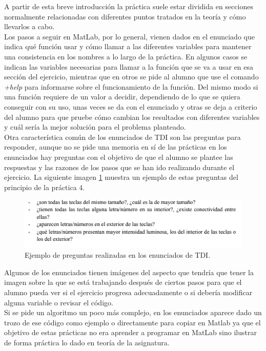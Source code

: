 \documentclass[a4paper,12pt]{report}
\begin{document}
A partir de esta breve introducción la práctica suele estar dividida en secciones normalmente relacionadas con diferentes puntos tratados en la teoría y cómo llevarlos a cabo.\\

Los pasos a seguir en MatLab, por lo general, vienen dados en el enunciado que indica qué función usar y cómo llamar a las diferentes variables para mantener una consistencia en los nombres a lo largo de la práctica. En algunos casos se indican las variables necesarias para llamar a la función que se va a usar en esa sección del ejercicio, mientras que en otros se pide al alumno que use el comando \textsl{+help} para informarse sobre el funcionamiento de la función. Del mismo modo si una función requiere de un valor a decidir, dependiendo de lo que se quiera conseguir con su uso, unas veces se da con el enunciado y otras se deja a criterio del alumno para que pruebe cómo cambian los resultados con diferentes variables y cuál sería la mejor solución para el problema planteado.\\

Otra característica común de los enunciados de TDI son las preguntas para responder, aunque no se pide una memoria en sí de las prácticas en los enunciados hay preguntas con el objetivo de que el alumno se plantee las respuestas y las razones de los pasos que se han ido realizando durante el ejercicio.  La siguiente imagen \ref{preguntasp4} muestra un ejemplo de estas preguntas del principio de la práctica 4.

\begin{figure}[h]
\centering
\includegraphics[width=1\textwidth]{imagenes/preguntasp4}
\caption{Ejemplo de preguntas realizadas en los enunciados de TDI.}
\label{preguntasp4}
\end{figure}

Algunos de los enunciados tienen imágenes del aspecto que tendría que tener la imagen sobre la que se está trabajando después de ciertos pasos para que el alumno pueda ver si el ejercicio progresa adecuadamente o si debería modificar alguna variable o revisar el código.\\

Si se pide un algoritmo un poco más complejo, en los enunciados aparece dado un trozo de ese código como ejemplo o directamente para copiar en Matlab ya que el objetivo de estas prácticas no era aprender a programar en MatLab sino ilustrar de forma práctica lo dado en teoría de la asignatura.\\
\end{document}
